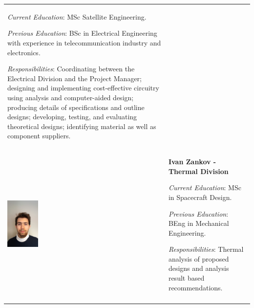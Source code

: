 \begin{longtable}[]{m{} m{}}
\smallskip
\textit{Current Education}: MSc Satellite Engineering.

\smallskip
\textit{Previous Education}: BSc in Electrical Engineering with experience in telecommunication industry and electronics.

\smallskip
\textit{Responsibilities}: Coordinating between the Electrical Division and the Project Manager; designing and implementing cost-effective circuitry using analysis and computer-aided design; producing details of specifications and outline designs; developing, testing, and evaluating theoretical designs; identifying material as well as component suppliers. 
\bigskip
\\


\includegraphics[width=0.2\textwidth]{1-introduction/img/ivan-zankov.jpg} & \textbf{Ivan Zankov - Thermal Division}

\smallskip
\textit{Current Education}: MSc in Spacecraft Design.

\smallskip
\textit{Previous Education}: BEng in Mechanical Engineering.

\smallskip
\textit{Responsibilities}: Thermal analysis of proposed designs and analysis result based recommendations.                                                         

\\
\label{tab:people}
\end{longtable}
\raggedbottom